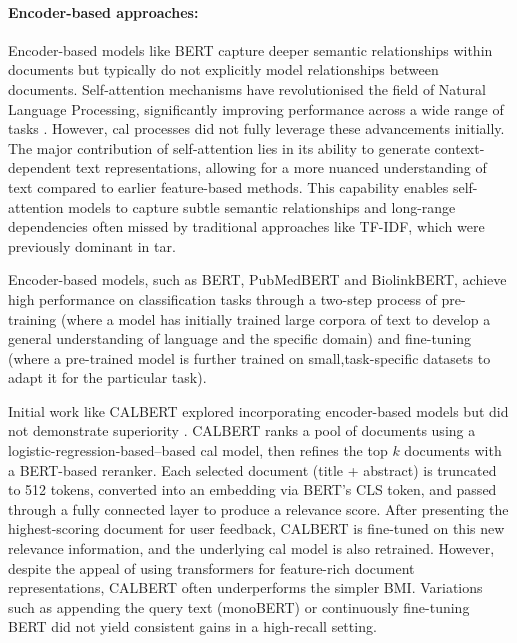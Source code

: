 \documentclass[10pt,oneside]{book}
\begin{document}
\paragraph{Encoder-based approaches: }

Encoder-based models like BERT capture deeper semantic relationships within documents but typically do not explicitly model relationships between documents. Self-attention mechanisms have revolutionised the field of Natural Language Processing, significantly improving performance across a wide range of tasks \cite{vaswani_attention_2023}. However, \gls*{cal} processes did not fully leverage these advancements initially. The major contribution of self-attention lies in its ability to generate context-dependent text representations, allowing for a more nuanced understanding of text compared to earlier feature-based methods. This capability enables self-attention models to capture subtle semantic relationships and long-range dependencies often missed by traditional approaches like TF-IDF, which were previously dominant in \gls*{tar}.

Encoder-based models, such as BERT, PubMedBERT and BiolinkBERT, achieve high performance on classification tasks through a two-step process of pre-training (where a model has initially trained large corpora of text to develop a general understanding of language and the specific domain) and fine-tuning (where a pre-trained model is further trained on small,task-specific datasets to adapt it for the particular task). 

Initial work like CALBERT explored incorporating encoder-based models but did not demonstrate superiority \cite{sadri_continuous_2022}. CALBERT ranks a pool of documents using a logistic-regression-based–based \gls*{cal} model, then refines the top $k$ documents with a BERT-based reranker. Each selected document (title + abstract) is truncated to 512 tokens, converted into an embedding via BERT's CLS token, and passed through a fully connected layer to produce a relevance score. After presenting the highest-scoring document for user feedback, CALBERT is fine-tuned on this new relevance information, and the underlying \gls*{cal} model is also retrained. However, despite the appeal of using transformers for feature-rich document representations, CALBERT often underperforms the simpler BMI. Variations such as appending the query text (monoBERT) or continuously fine-tuning BERT did not yield consistent gains in a high-recall setting. 
\end{document}
